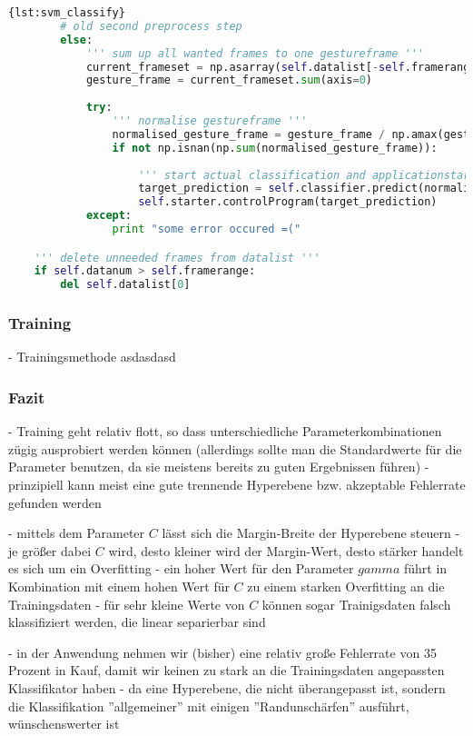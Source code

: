 \begin{lstlisting}[language=Python,caption={Classify},label={lst:svm_classify}]{lst:svm_classify}
		# old second preprocess step
		else:
			''' sum up all wanted frames to one gestureframe '''
			current_frameset = np.asarray(self.datalist[-self.framerange:])
			gesture_frame = current_frameset.sum(axis=0)
			
			try:
				''' normalise gestureframe '''
				normalised_gesture_frame = gesture_frame / np.amax(gesture_frame)
				if not np.isnan(np.sum(normalised_gesture_frame)):
					
					''' start actual classification and applicationstarter '''
					target_prediction = self.classifier.predict(normalised_gesture_frame)[0]  # only each second?!?
					self.starter.controlProgram(target_prediction)
			except:
				print "some error occured =("

	''' delete unneeded frames from datalist '''
	if self.datanum > self.framerange:
		del self.datalist[0]
\end{lstlisting}


\subsubsection{Training}
- Trainingsmethode
asdasdasd



\subsubsection{Fazit}
- Training geht relativ flott, so dass unterschiedliche Parameterkombinationen zügig ausprobiert werden können (allerdings sollte man die Standardwerte für die Parameter benutzen, da sie meistens bereits zu guten Ergebnissen führen)
- prinzipiell kann meist eine gute trennende Hyperebene bzw. akzeptable Fehlerrate gefunden werden

- mittels dem Parameter $C$ lässt sich die Margin-Breite der Hyperebene steuern
- je größer dabei $C$ wird, desto kleiner wird der Margin-Wert, desto stärker handelt es sich um ein Overfitting
- ein hoher Wert für den Parameter $gamma$ führt in Kombination mit einem hohen Wert für $C$ zu einem starken Overfitting an die Trainingsdaten
- für sehr kleine Werte von $C$ können sogar Trainigsdaten falsch klassifiziert werden, die linear separierbar sind

- in der Anwendung nehmen wir (bisher) eine relativ große Fehlerrate von 35 Prozent in Kauf, damit wir keinen zu stark an die Trainingsdaten angepassten Klassifikator haben
- da eine Hyperebene, die nicht überangepasst ist, sondern die Klassifikation ''allgemeiner'' mit einigen ''Randunschärfen'' ausführt, wünschenswerter ist

